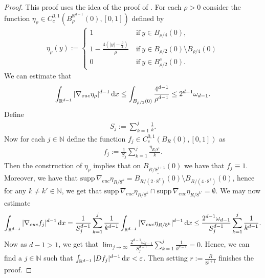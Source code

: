 \documentclass[a4paper,10pt]{article}
\numberwithin{equation}{section}
\newcommand{\R}{\mathbb{R}}
\newcommand{\N}{\mathbb{N}}
\newcommand{\e}{\varepsilon}
\newcommand{\supp}{\mathrm{supp}}
\newcommand{\di}{{\rm d}}
\begin{document}
 \begin{proof}
     This proof uses the idea of the proof of \cite[Theorem 4.16]{evans2025measure}. For each $\rho>0$ consider the function $\eta_\rho \in C_c^{0,1}(B^{\R^{d-1}}_\rho(0), [0,1])$ defined by
     \begin{align}
           \eta_\rho(y) := \left\{ \begin{array}{ll}
           1 & \mathrm{if}\ y \in B_{\rho/4}(0), \\
           1-\frac{4(|y|-\frac{\rho}{4})}{\rho}\  & \mathrm{if} \ y \in B_{\rho/2}(0) \setminus B_{\rho/4}(0) \\
           0 & \mathrm{if}\ y \in B^c_{\rho/2}(0).
        \end{array}\right.
     \end{align}
     We can estimate that
     \begin{align}
         \int_{\R^{d-1}} |\nabla_{euc} \eta_\rho|^{d-1} \, \di x \leq  \int_{B_{\rho/2}(0)} \frac{4^{d-1}}{\rho^{d-1}} \leq 2^{d-1}\omega_{d-1}.
     \end{align}
     Define 
     \begin{align*}
         S_j:= \sum_{k=1}^j \frac{1}{k}.
     \end{align*}
     Now for each $j \in \N$ define the function $f_j \in C^{0,1}_c(B_R(0), [0,1])$ as
     \begin{align}
         f_j:= \frac{1}{S_j} \sum_{k=1}^j\frac{\eta_{R/8^k}}{k}.
     \end{align}
     Then the construction of $\eta_\rho$ implies that on $B_{R/8^{j+1}}(0)$ we have that $f_j \equiv 1$. Moreover, we have that $\supp \, \nabla_{euc}\eta_{R/8^k} = \overline{B_{R/(2 \cdot 8^k)}(0)} \setminus B_{R/(4 \cdot 8^k)}(0)$, hence for any $k \neq k' \in \N$, we get that $\supp \, \nabla_{euc}\eta_{R/8^k} \cap \supp \, \nabla_{euc}\eta_{R/8^{k'}} = \emptyset$. We may now estimate
     \begin{align*}
         \int_{\R^{d-1}} |\nabla_{euc}f_j|^{d-1}\, \di x = \frac{1}{S_j^{d-1}} \sum_{k=1}^j \frac{1}{k^{d-1}}\int_{\R^{d-1}} |\nabla_{euc} \eta_{R/8^k}|^{d-1}\, \di x \leq \frac{2^{d-1}\omega_{d-1}}{S_j^{d-1}} \sum_{k=1}^j \frac{1}{k^{d-1}}.
     \end{align*}
     Now as $d-1>1$, we get that $\lim_{j \to \infty} \frac{2^{d-1}\omega_{d-1}}{S_j^{d-1}} \sum_{k=1}^j \frac{1}{k^{d-1}} =0$. Hence, we can find a $j \in \N$ such that $\int_{\R^{d-1}} |Df_j|^{d-1}\, \di x < \e$. Then setting $r:= \frac{R}{8^{j+1}}$ finishes the proof. 
 \end{proof}
\end{document}
